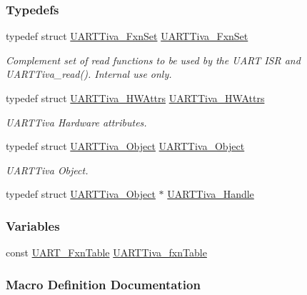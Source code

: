 \subsubsection*{Typedefs}
\begin{DoxyCompactItemize}
\item 
typedef struct \hyperlink{struct_u_a_r_t_tiva___fxn_set}{U\+A\+R\+T\+Tiva\+\_\+\+Fxn\+Set} \hyperlink{_u_a_r_t_tiva_8h_ada02c4e98c5fe4791f8781c6d8b950fb}{U\+A\+R\+T\+Tiva\+\_\+\+Fxn\+Set}
\begin{DoxyCompactList}\small\item\em Complement set of read functions to be used by the U\+A\+R\+T I\+S\+R and U\+A\+R\+T\+Tiva\+\_\+read(). Internal use only. \end{DoxyCompactList}\item 
typedef struct \hyperlink{struct_u_a_r_t_tiva___h_w_attrs}{U\+A\+R\+T\+Tiva\+\_\+\+H\+W\+Attrs} \hyperlink{_u_a_r_t_tiva_8h_aac0b6013ab2db43424519532f9bf1ef6}{U\+A\+R\+T\+Tiva\+\_\+\+H\+W\+Attrs}
\begin{DoxyCompactList}\small\item\em U\+A\+R\+T\+Tiva Hardware attributes. \end{DoxyCompactList}\item 
typedef struct \hyperlink{struct_u_a_r_t_tiva___object}{U\+A\+R\+T\+Tiva\+\_\+\+Object} \hyperlink{_u_a_r_t_tiva_8h_a415fb8fc7172a69540bef335b0ba6735}{U\+A\+R\+T\+Tiva\+\_\+\+Object}
\begin{DoxyCompactList}\small\item\em U\+A\+R\+T\+Tiva Object. \end{DoxyCompactList}\item 
typedef struct \hyperlink{struct_u_a_r_t_tiva___object}{U\+A\+R\+T\+Tiva\+\_\+\+Object} $\ast$ \hyperlink{_u_a_r_t_tiva_8h_aaeecfa764f24fc2f566ca149dc091e78}{U\+A\+R\+T\+Tiva\+\_\+\+Handle}
\end{DoxyCompactItemize}
\subsubsection*{Variables}
\begin{DoxyCompactItemize}
\item 
const \hyperlink{struct_u_a_r_t___fxn_table}{U\+A\+R\+T\+\_\+\+Fxn\+Table} \hyperlink{_u_a_r_t_tiva_8h_a4b0dd67d0f6e16ffba1aa4ba8cf1db6f}{U\+A\+R\+T\+Tiva\+\_\+fxn\+Table}
\end{DoxyCompactItemize}


\subsubsection{Macro Definition Documentation}

